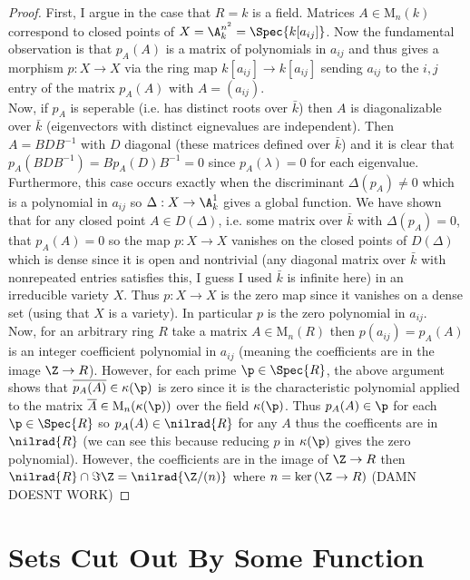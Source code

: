 \documentclass[12pt]{article}
\begin{document}
\begin{proof}
First, I argue in the case that $R = k$ is a field.
Matrices $A \in \mathrm{M}_n(k)$ correspond to closed points of $X = \A^{n^2}_k = \Spec{k[a_{ij}]}$. Now the fundamental observation is that $p_A(A)$ is a matrix of polynomials in $a_{ij}$ and thus gives a morphism $p : X \to X$ via the ring map $k[a_{ij}] \to k[a_{ij}]$ sending $a_{ij}$ to the $i,j$ entry of the matrix $p_A(A)$ with $A = (a_{ij})$. 
\bigskip\\
Now, if $p_A$ is seperable (i.e. has distinct roots over $\bar{k}$) then $A$ is diagonalizable over $\bar{k}$ (eigenvectors with distinct eignevalues are independent). Then $A = B D B^{-1}$ with $D$ diagonal (these matrices defined over $\bar{k}$) and it is clear that $p_A(B D B^{-1}) = B p_A(D) B^{-1} = 0$ since $p_A(\lambda) = 0$ for each eigenvalue. Furthermore, this case occurs exactly when the discriminant $\Delta(p_A) \neq 0$ which is a polynomial in $a_{ij}$ so $\Delta : X \to \A^1_k$ gives a global function. We have shown that for any closed point $A \in D(\Delta)$, i.e. some matrix over $\bar{k}$ with $\Delta(p_A) = 0$, that  $p_A(A) = 0$ so the map $p : X \to X$ vanishes on the closed points of $D(\Delta)$ which is dense since it is open and nontrivial (any diagonal matrix over $\bar{k}$ with nonrepeated entries satisfies this, I guess I used $\bar{k}$ is infinite here) in an irreducible variety $X$. Thus $p : X \to X$ is the zero map since it vanishes on a dense set (using that $X$ is a variety). In particular $p$ is the zero polynomial in $a_{ij}$.
\bigskip\\
Now, for an arbitrary ring $R$ take a matrix $A \in \mathrm{M}_n(R)$ then $p(a_{ij}) = p_A(A)$ is an integer coefficient polynomial in $a_{ij}$ (meaning the coefficients are in the image $\Z \to R$). However, for each prime $\p \in \Spec{R}$, the above argument shows that $\overline{p_A(A)} \in \kappa(\p)$ is zero since it is the characteristic polynomial applied to the matrix $\overline{A} \in \mathrm{M}_n(\kappa(\p))$ over the field $\kappa(\p)$. Thus $p_A(A) \in \p$ for each $\p \in \Spec{R}$ so $p_A(A) \in \nilrad{R}$ for any $A$ thus the coefficents are in $\nilrad{R}$ (we can see this because reducing $p$ in $\kappa(\p)$ gives the zero polynomial). However, the coefficients are in the image of $\Z \to R$ then $\nilrad{R} \cap \Im{\Z} = \nilrad{\Z / (n)}$ where $n = \ker{(\Z \to R)}$ 
(DAMN DOESNT WORK)
\end{proof}


\section{Sets Cut Out By Some Function}
\end{document}
